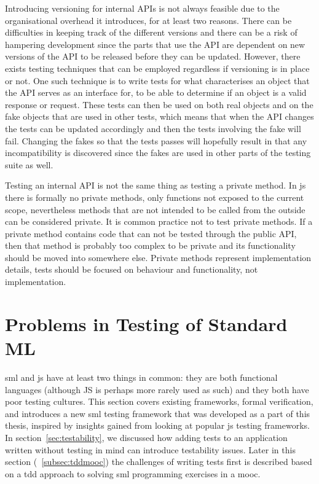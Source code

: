 \documentclass[11pt]{article}
\begin{document}
Introducing versioning for internal APIs is not always feasible due to the organisational overhead it introduces, for at least two reasons. There can be difficulties in keeping track of the different versions and there can be a risk of hampering development since the parts that use the API are dependent on new versions of the API to be released before they can be updated. However, there exists testing techniques that can be employed regardless if versioning is in place or not. One such technique is to write tests for what characterises an object that the API serves as an interface for, to be able to determine if an object is a valid response or request. These tests can then be used on both real objects and on the fake objects that are used in other tests, which means that when the API changes the tests can be updated accordingly and then the tests involving the fake will fail. Changing the fakes so that the tests passes will hopefully result in that any incompatibility is discovered since the fakes are used in other parts of the testing suite as well. \cite[question~34]{Edelstam}

Testing an internal API is not the same thing as testing a private method. In \gls{js} there is formally no private methods, only functions not exposed to the current scope, nevertheless methods that are not intended to be called from the outside can be considered private. It is common practice not to test private methods. If a private method contains code that can not be tested through the public API, then that method is probably too complex to be private and its functionality should be moved into somewhere else. Private methods represent implementation details, tests should be focused on behaviour and functionality, not implementation. \cite[questions~62-63]{Edelstam}

\section{Problems in Testing of Standard ML}
\label{sec:smlproblems}

\Gls{sml} and \gls{js} have at least two things in common: they are both functional languages (although JS is perhaps more rarely used as such) and they both have poor testing cultures. This section covers existing frameworks, formal verification, and introduces a new \gls{sml} testing framework that was developed as a part of this thesis, inspired by insights gained from looking at popular \gls{js} testing frameworks. In section~\ref{sec:testability}, we discussed how adding tests to an application written without testing in mind can introduce testability issues. Later in this section (~\ref{subsec:tddmooc}) the challenges of writing tests first is described based on a \gls{tdd} approach to solving \gls{sml} programming exercises in a \gls{mooc}.
\end{document}
